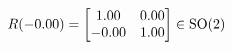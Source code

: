 \documentclass[preview]{standalone}
\begin{document}
\begin{align*}
\special{dvisvgm:raw <g id='unique000'>}R(-0.00) = \begin{bmatrix} 1.00 & 0.00 \\ -0.00 & 1.00 \end{bmatrix} \in \text{SO}(2)\special{dvisvgm:raw </g>}
\end{align*}
\end{document}
